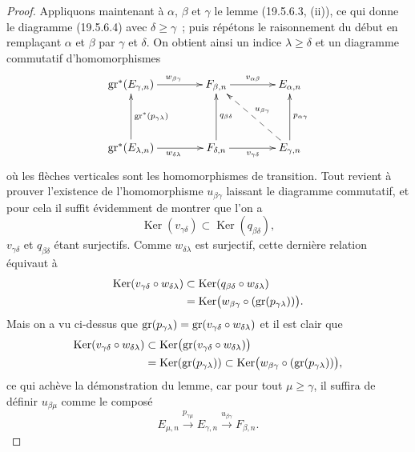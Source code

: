 \begin{proof}
Appliquons maintenant à $\alpha$, $\beta$ et $\gamma$ le lemme (19.5.6.3,
(ii)), ce qui donne le diagramme (19.5.6.4) avec $\delta\geq\gamma$~; puis
répétons le raisonnement du début en remplaçant $\alpha$ et $\beta$ par
$\gamma$ et $\delta$. On obtient ainsi un indice $\lambda\geq\delta$ et un
diagramme commutatif d'homomorphismes
\[
\xymatrix@C=4em@R=4em{
  \gr^*(E_{\gamma,n})\ar[r]^{w_{\beta\gamma}} &
  F_{\beta,n}\ar[r]^{v_{\alpha\beta}} & E_{\alpha,n} \\
  \gr^*(E_{\lambda,n})\ar[u]_{\gr^*(p_{\gamma\lambda})}
    \ar[r]_{w_{\delta\lambda}} &
  F_{\delta,n}\ar[u]_{q_{\beta\delta}}\ar[r]_{v_{\gamma\delta}} &
  E_{\gamma,n}\ar[u]_{p_{\alpha\gamma}}
    \ar@{-->}[ul]_{u_{\beta\gamma}}
}
\]
où les flèches verticales sont les homomorphismes de transition. Tout revient
à prouver l'existence de l'homomorphisme $u_{\beta\gamma}$ laissant le
diagramme commutatif, et pour cela il suffit évidemment de montrer que l'on a
\[
  \operatorname{Ker}(v_{\gamma\delta})
  \subset\operatorname{Ker}(q_{\beta\delta}),
\]
$v_{\gamma\delta}$ et $q_{\beta\delta}$ étant surjectifs. Comme
$w_{\delta\lambda}$ est surjectif, cette dernière relation équivaut à
\[
\begin{split}
  \operatorname{Ker}(v_{\gamma\delta}\circ w_{\delta\lambda})
  &\subset\operatorname{Ker}(q_{\beta\delta}\circ w_{\delta\lambda})\\
  &=\operatorname{Ker}\bigl(w_{\beta\gamma}\circ
  (\operatorname{gr}(p_{\gamma\lambda}))\bigr).
\end{split}
\]
Mais on a vu ci-dessus que
$\operatorname{gr}(p_{\gamma\lambda})=\operatorname{gr}(v_{\gamma\delta}\circ w_{\delta\lambda})$ et il
est clair que
\[
\begin{split}
  \operatorname{Ker}(v_{\gamma\delta}\circ w_{\delta\lambda})
  &\subset\operatorname{Ker}\bigl(\operatorname{gr}(v_{\gamma\delta}\circ
  w_{\delta\lambda})\bigr)\\
  &=\operatorname{Ker}(\operatorname{gr}(p_{\gamma\lambda}))
  \subset\operatorname{Ker}\bigl(w_{\beta\gamma}\circ
  (\operatorname{gr}(p_{\gamma\lambda}))\bigr),
\end{split}
\]
ce qui achève la démonstration du lemme, car pour tout $\mu\geq\gamma$, il
suffira de définir $u_{\beta\mu}$ comme le composé
\[
  E_{\mu,n}\xrightarrow{p_{\gamma\mu}}E_{\gamma,n}
  \xrightarrow{u_{\beta\gamma}}F_{\beta,n}.
\]
\end{proof}

